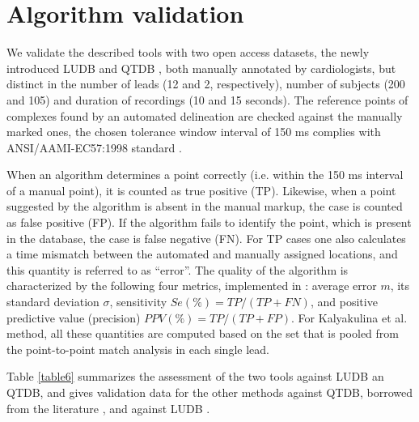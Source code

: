 \documentclass[submitted]{ieeeaccess}
\begin{document}
\section{Algorithm validation}\label{results}

We validate the described tools \cite{ECGKit,Kalyakulina2018} with two open access datasets, the newly introduced LUDB and QTDB \cite{qtdb}, both manually annotated by cardiologists, but distinct in the number of leads (12 and 2, respectively), number of subjects (200 and 105) and duration of recordings (10 and 15 seconds). The reference points of complexes found by an automated delineation are checked against the manually marked ones, the chosen tolerance window interval of 150 ms complies with ANSI/AAMI-EC57:1998 standard \cite{standart1999}.

When an algorithm determines a point correctly (i.e. within the 150 ms interval of a manual point), it is counted as true positive (TP). Likewise, when a point suggested by the algorithm is absent in the manual markup, the case is counted as false positive (FP). If the algorithm fails to identify the point, which is present in the database, the case is false negative (FN). For TP cases one also calculates a time mismatch between the automated and manually assigned locations, and this quantity is referred to as ``error''. The quality of the algorithm is characterized by the following four metrics, implemented in \cite{Rincon2011, DiMarco2011, Martinez2004, Bote2017}: average error $m$, its standard deviation $\sigma$, sensitivity $Se(\%) = TP / (TP + FN)$, and positive predictive value (precision) $PPV(\%) = TP / (TP + FP)$. For Kalyakulina et al. method, all these quantities are computed based on the set that is pooled from the point-to-point match analysis in each single lead. 

Table \ref{table6} summarizes the assessment of the two tools \cite{ECGKit,Kalyakulina2018} against LUDB an QTDB, and gives validation data for the other methods against QTDB, borrowed from the literature 
\cite{Martinez2004, Rincon2011, DiMarco2011, Bote2017}, and against LUDB \cite{Chen2020}.
\end{document}
